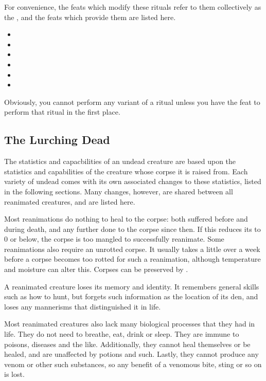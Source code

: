 For convenience, the feats which modify these rituals refer to them collectively as the {\reanimationrituals}, and the feats which provide them are listed here.
\begin{itemize}
	\item {}
	\item {}
	\item {}
	\item {}
	\item {}
	\item {}
\end{itemize}
Obviously, you cannot perform any variant of a ritual unless you have the feat to perform that ritual in the first place.

\subsection{The Lurching Dead}

The statistics and capacbilities of an undead creature are based upon the statistics and capabilities of the creature whose corpse it is raised from.
Each variety of undead comes with its own associated changes to these statistics, listed in the following sections.
Many changes, however, are shared between all reanimated creatures, and are listed here.

Most reanimations do nothing to heal {\damage} to the corpse: both {\damage} suffered before and during death, and any further {\damage} done to the corpse since then.
If this reduces its  to 0 or below, the corpse is too mangled to successfully reanimate.
Some reanimations also require an unrotted corpse.
It usually takes a little over a week before a corpse becomes too rotted for such a reanimation, although temperature and moisture can alter this.
Corpses can be preserved by {\embalming}.

A reanimated creature loses its memory and identity.
It remembers general skills such as how to hunt, but forgets such information as the location of its den, and loses any mannerisms that distinguished it in life.

Most reanimated creatures also lack many biological processes that they had in life.
They do not need to breathe, eat, drink or sleep.
They are immune to poisons, diseases and the like.
Additionally, they cannot heal themselves or be healed, and are unaffected by potions and such.
Lastly, they cannot produce any venom or other such substances, so any benefit of a venomous bite, sting or so on is lost.

